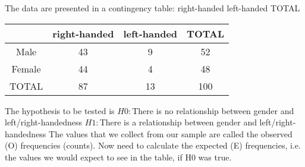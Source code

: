 The data are presented in a contingency table:
right-handed left-handed TOTAL

\begin{tabular}{|c|c|c|c|}
	\hline
	& right-handed &left-handed & TOTAL\\\hline
	Male & 43 & 9 & 52 \\
	Female & 44 & 4 & 48 \\
	TOTAL & 87 & 13 & 100 \\
	\hline
\end{tabular}


The hypothesis to be tested is
$H0 :$There is no relationship between gender and left/right-handedness
$H1 :$There is a relationship between gender and left/right-handedness
The values that we collect from our sample are called the observed
(O) frequencies (counts). Now need to calculate the expected (E)
frequencies, i.e. the values we would expect to see in the table, if
H0 was true.






